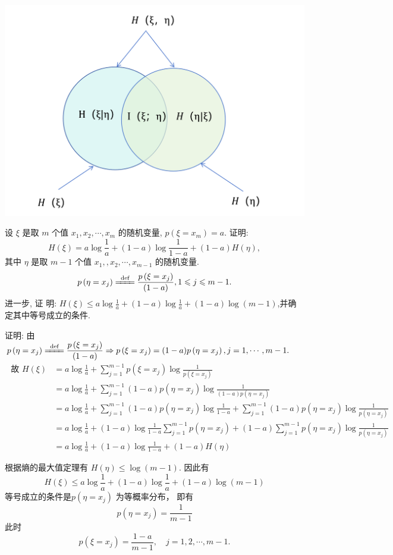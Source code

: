 \begin{tcolorbox}[breakable,colback=blue!5!white,colframe=blue!75!black,
 title= 2024-03-11]
    \centering
    \includegraphics[width=0.4\linewidth]{1.png}
\end{tcolorbox}


\begin{tcolorbox}[breakable,colback=blue!5!white,colframe=blue!75!black,
 title= 2024-03-11]
 设 $ \xi $ 是取 $ m $ 个值 $ x_{1}, x_{2}, \cdots, x_{m} $ 的随机变量, $ p\left(\xi=x_{m}\right)=a $. 证明:
$$
H(\xi)=a \log \frac{1}{a}+(1-a) \log \frac{1}{1-a}+(1-a) H(\eta),
$$
其中 $ \eta $ 是取 $ m-1 $ 个值 $ x_{1},, x_{2}, \cdots, x_{m-1} $ 的随机变量.
$$
p\left(\eta=x_{j}\right) \xlongequal{\text { def }}\frac{p\left(\xi=x_{j}\right)} {(1-a)}, 1 \leqslant j \leqslant m-1 .
$$
进一步, 证
明: $ H(\xi) \leqslant a \log \frac{1}{a}+(1-a) \log \frac{1}{a}+(1-a) \log (m-1) $,并确定其中等号成立的条件.

\tcblower

     证明: 由 $ p\left(\eta=x_{j}\right) \xlongequal{\text { def }}\dfrac{p\left(\xi=x_{j}\right)}{(1-a)}  \Rightarrow p\left(\xi=x_{j}\right)=(1-a) p\left(\eta=x_{j}\right), j=1, \cdots, m-1 . $
$$
\begin{aligned}
\text { 故 } H(\xi)&=a \log \frac{1}{a}+\sum_{j=1}^{m-1} p\left(\xi=x_{j}\right) \log \frac{1}{p\left(\xi=x_{j}\right)} \\
&=a \log \frac{1}{a}+\sum_{j=1}^{m-1}(1-a) p\left(\eta=x_{j}\right) \log \frac{1}{(1-a) p\left(\eta=x_{j}\right)}\\
&=a \log \frac{1}{a}+\sum_{j=1}^{m-1}(1-a) p\left(\eta=x_{j}\right) \log \frac{1}{1-a} +\sum_{j=1}^{m-1}(1-a) p\left(\eta=x_{j}\right) \log \frac{1}{p\left(\eta=x_{j}\right)} \\
&=a \log \frac{1}{a}+(1-a) \log \frac{1}{1-a} \sum_{j=1}^{m-1} p\left(\eta=x_{j}\right) +(1-a) \sum_{j=1}^{m-1} p\left(\eta=x_{j}\right) \log \frac{1}{p\left(\eta=x_{j}\right)} \\
&=a \log \frac{1}{a}+(1-a) \log \frac{1}{1-a}+(1-a) H(\eta)
\end{aligned}
$$

根据熵的最大值定理有 $ H(\eta)\leqslant \log (m-1) $. 因此有
$$ H(\xi) \leqslant a \log \frac{1}{a}+(1-a) \log \frac{1}{a}+(1-a) \log (m-1) $$
等号成立的条件是$ p\left(\eta=x_{j}\right) $ 为等概率分布，
即有
$$
p\left(\eta=x_{j}\right)=\frac{1}{m-1} 
$$
此时$$
 p\left(\xi=x_{j}\right)=\frac{1-a}{m-1}, \quad j=1,2, \cdots, m-1 .
$$

\end{tcolorbox}

